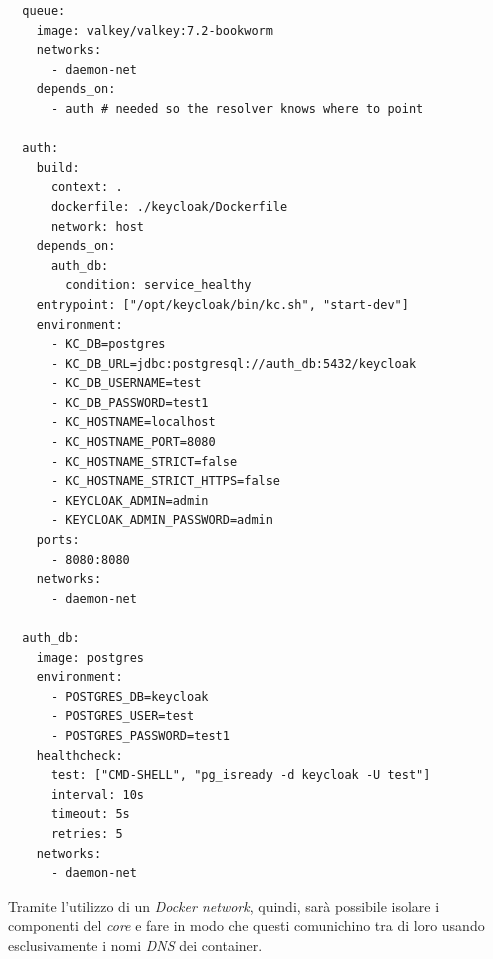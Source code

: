 \begin{verbatim}
  queue:
    image: valkey/valkey:7.2-bookworm
    networks:
      - daemon-net
    depends_on:
      - auth # needed so the resolver knows where to point

  auth:
    build:
      context: .
      dockerfile: ./keycloak/Dockerfile
      network: host
    depends_on:
      auth_db:
        condition: service_healthy
    entrypoint: ["/opt/keycloak/bin/kc.sh", "start-dev"]
    environment:
      - KC_DB=postgres
      - KC_DB_URL=jdbc:postgresql://auth_db:5432/keycloak
      - KC_DB_USERNAME=test
      - KC_DB_PASSWORD=test1
      - KC_HOSTNAME=localhost
      - KC_HOSTNAME_PORT=8080
      - KC_HOSTNAME_STRICT=false
      - KC_HOSTNAME_STRICT_HTTPS=false
      - KEYCLOAK_ADMIN=admin
      - KEYCLOAK_ADMIN_PASSWORD=admin
    ports:
      - 8080:8080
    networks:
      - daemon-net

  auth_db:
    image: postgres
    environment:
      - POSTGRES_DB=keycloak
      - POSTGRES_USER=test
      - POSTGRES_PASSWORD=test1
    healthcheck:
      test: ["CMD-SHELL", "pg_isready -d keycloak -U test"]
      interval: 10s
      timeout: 5s
      retries: 5
    networks:
      - daemon-net

\end{verbatim}

Tramite l'utilizzo di un \textit{Docker network}, quindi, sarà possibile isolare i componenti del \textit{core} e fare in modo che questi comunichino tra di loro usando esclusivamente i nomi \textit{DNS} dei container.
\newpage
